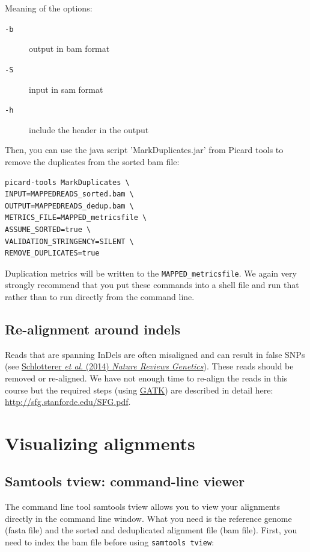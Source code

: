 \documentclass[11pt]{article}
\begin{document}
Meaning of the options:
\begin{description}
\item[{\texttt{-b}}] output in bam format
\item[{\texttt{-S}}] input in sam format
\item[{\texttt{-h}}] include the header in the output
\end{description}



Then, you can use the java script 'MarkDuplicates.jar' from Picard
tools to remove the duplicates from the sorted bam file:

\begin{verbatim}
picard-tools MarkDuplicates \
INPUT=MAPPEDREADS_sorted.bam \
OUTPUT=MAPPEDREADS_dedup.bam \
METRICS_FILE=MAPPED_metricsfile \
ASSUME_SORTED=true \
VALIDATION_STRINGENCY=SILENT \
REMOVE_DUPLICATES=true
\end{verbatim}

Duplication metrics will be written to the \texttt{MAPPED\_metricsfile}. We again
very strongly recommend that you put these commands into a shell file and run
that rather than to run directly from the command line.


\subsection{Re-alignment around indels}
\label{sec-2-2}
Reads that are spanning InDels are often misaligned and can result in
false SNPs (see \href{http://www.nature.com/nrg/journal/v15/n11/full/nrg3803.html}{Schlotterer \emph{et al}. (2014) \emph{Nature Reviews
Genetics}}). These reads should be removed or re-aligned. We have not
enough time to re-align the reads in this course but the required
steps (using \href{https://www.broadinstitute.org/gatk/}{GATK}) are described in detail here:
\url{http://sfg.stanforde.edu/SFG.pdf}.

\section{Visualizing alignments}
\label{sec-3}
\subsection{Samtools tview: command-line viewer}
\label{sec-3-1}
The command line tool samtools tview allows you to view your
alignments directly in the command line window. What you need is the
reference genome (fasta file) and the sorted and deduplicated
alignment file (bam file). First, you need to index the bam file
before using \texttt{samtools tview}:
\end{document}
